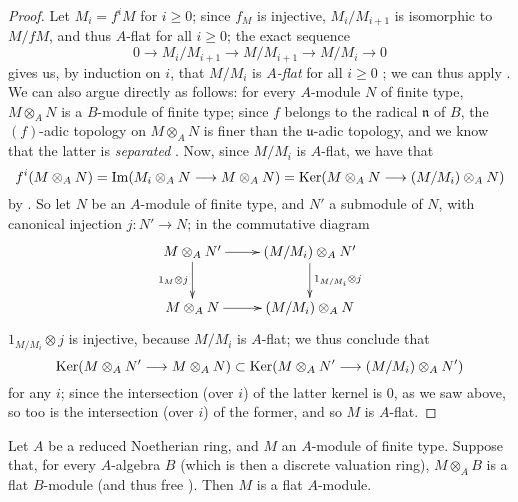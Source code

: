 \begin{proof}
\label{proof-0.10.2.7}
Let $M_i=f^iM$ for $i\geq0$;
since $f_M$ is injective, $M_i/M_{i+1}$ is isomorphic to $M/fM$, and thus $A$-flat for all $i\geq0$;
the exact sequence
\[
  0\to M_i/M_{i+1}\to M/M_{i+1}\to M/M_i\to 0
\]
gives us, by induction on $i$, that $M/M_i$ is \emph{$A$-flat} for all $i\geq0$ ;
we can thus apply .
We can also argue directly as follows:
for every $A$-module $N$ of finite type, $M\otimes_A N$ is a $B$-module of finite type;
since $f$ belongs to the radical $\mathfrak{n}$ of $B$, the $(f)$-adic topology on $M\otimes_A N$ is finer than the
$\mathfrak{u}$-adic topology, and we know that the latter is \emph{separated} \sref[0\textsubscript{I},0.7.3.5].
Now, since $M/M_i$ is $A$-flat, we have that
\[
  f^i(M\otimes_A N)=\Im(M_i\otimes_A N\to M\otimes_A N)=\Ker(M\otimes_A N\to(M/M_i)\otimes_A N)
\]
by .
So let $N$ be an $A$-module of finite type, and $N'$ a submodule of $N$, with canonical injection $j:N'\to N$; in the commutative diagram
\[
  \xymatrix{
    M\otimes_A N'\ar[r]\ar[d]_{1_M\otimes j} &
    (M/M_i)\otimes_A N'\ar[d]^{1_{M/M_i}\otimes j}\\
    M\otimes_A N\ar[r] &
    (M/M_i)\otimes_A N
  }
\]
$1_{M/M_i}\otimes j$ is injective, because $M/M_i$ is $A$-flat; we thus conclude that
\[
  \Ker(M\otimes_A N'\to M\otimes_A N)\subset\Ker(M\otimes_A N'\to(M/M_i)\otimes_A N')
\]
for any $i$; since the intersection (over $i$) of the latter kernel is $0$, as we saw above, so too is the intersection (over $i$) of the former, and so $M$ is $A$-flat.
\end{proof}

\begin{proposition}[10.2.8]
\label{0.10.2.8}
Let $A$ be a reduced Noetherian ring, and $M$ an $A$-module of finite type.
Suppose that, for every $A$-algebra $B$ (which is then a discrete valuation ring), $M\otimes_A B$ is a flat $B$-module (and thus free ).
Then $M$ is a flat $A$-module.
\end{proposition}

